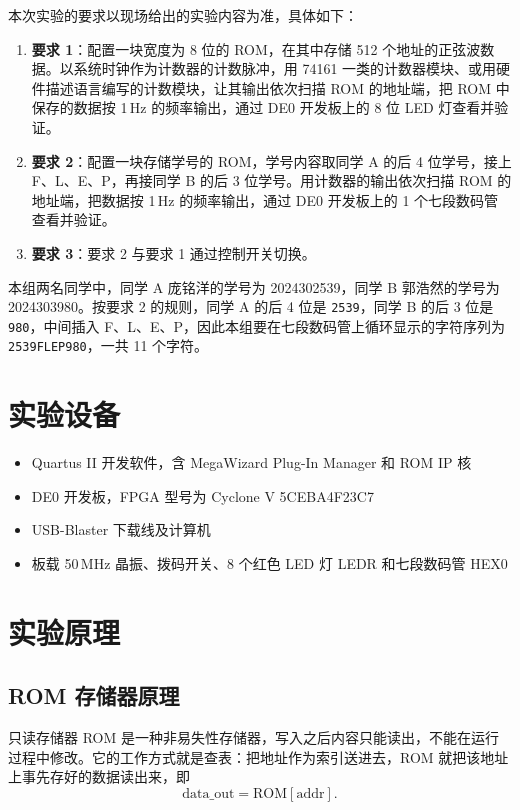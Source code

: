 \documentclass{ctexrep}
\begin{document}
本次实验的要求以现场给出的实验内容为准，具体如下：

\begin{enumerate}
    \item \textbf{要求 1}：配置一块宽度为 8 位的 ROM，在其中存储 512 个地址的正弦波数据。以系统时钟作为计数器的计数脉冲，用 74161 一类的计数器模块、或用硬件描述语言编写的计数模块，让其输出依次扫描 ROM 的地址端，把 ROM 中保存的数据按 1\,Hz 的频率输出，通过 DE0 开发板上的 8 位 LED 灯查看并验证。
    \item \textbf{要求 2}：配置一块存储学号的 ROM，学号内容取同学 A 的后 4 位学号，接上 F、L、E、P，再接同学 B 的后 3 位学号。用计数器的输出依次扫描 ROM 的地址端，把数据按 1\,Hz 的频率输出，通过 DE0 开发板上的 1 个七段数码管查看并验证。
    \item \textbf{要求 3}：要求 2 与要求 1 通过控制开关切换。
\end{enumerate}

本组两名同学中，同学 A 庞铭洋的学号为 2024302539，同学 B 郭浩然的学号为 2024303980。按要求 2 的规则，同学 A 的后 4 位是 \texttt{2539}，同学 B 的后 3 位是 \texttt{980}，中间插入 F、L、E、P，因此本组要在七段数码管上循环显示的字符序列为 \texttt{2539FLEP980}，一共 11 个字符。

\section{实验设备}

\begin{itemize}
    \item Quartus II 开发软件，含 MegaWizard Plug-In Manager 和 ROM IP 核
    \item DE0 开发板，FPGA 型号为 Cyclone V 5CEBA4F23C7
    \item USB-Blaster 下载线及计算机
    \item 板载 50\,MHz 晶振、拨码开关、8 个红色 LED 灯 LEDR 和七段数码管 HEX0
\end{itemize}

\section{实验原理}

\subsection{ROM 存储器原理}

只读存储器 ROM 是一种非易失性存储器，写入之后内容只能读出，不能在运行过程中修改。它的工作方式就是查表：把地址作为索引送进去，ROM 就把该地址上事先存好的数据读出来，即
\[
    \mathrm{data\_out} = \mathrm{ROM}[\mathrm{addr}].
\]
\end{document}
